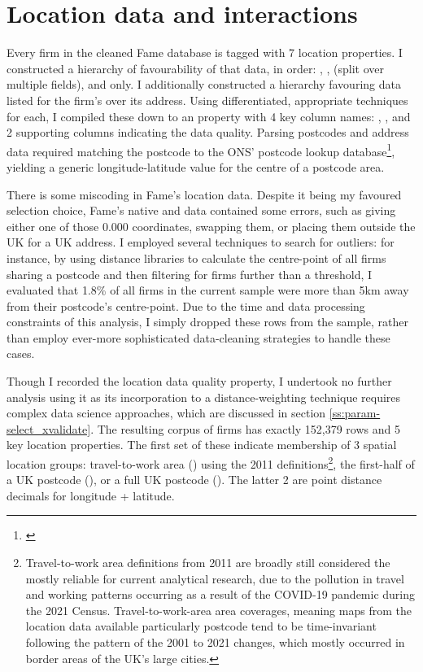 
\section{Location data and interactions}
\label{s:data-location}

Every firm in the cleaned Fame database is tagged with 7 location properties.
I constructed a hierarchy of favourability of that data, in order:
, ,  (split over multiple fields),
and  only. I additionally constructed a hierarchy favouring
data listed for the firm's  over its  address.
Using differentiated, appropriate techniques for each, I compiled these down
to an  property with 4 key column names: , ,
and 2 supporting columns indicating the data quality.
Parsing postcodes and address data required matching the postcode
to the ONS' postcode lookup database\footnote{\cite{ons2025:nspl}},
yielding a generic longitude-latitude value for the centre of a postcode area.
\par
There is some miscoding in Fame's location data.
Despite it being my favoured  selection choice,
Fame's native  and  data contained some errors,
such as giving either one of those $0.000$ coordinates, swapping them,
or placing them outside the UK for a UK address.
I employed several techniques to search for outliers:
for instance, by using distance libraries to calculate the centre-point of all firms sharing a postcode
and then filtering for firms further than a threshold,
I evaluated that 1.8\% of all firms in the current sample
were more than 5km away from their postcode's centre-point.
Due to the time and data processing constraints of this analysis,
I simply dropped these rows from the sample, rather than employ ever-more sophisticated
data-cleaning strategies to handle these cases.
\par
Though I recorded the location data quality property,
I undertook no further analysis using it as its incorporation
to a distance-weighting technique requires complex data science approaches,
which are discussed in section \ref{ss:param-select_xvalidate}.
The resulting corpus of firms has exactly 152,379 rows
and 5 key location properties. The first set of these indicate membership of 3 spatial location groups:
travel-to-work area () using the 2011
definitions\footnote{Travel-to-work area definitions from 2011 are broadly still considered
the mostly reliable for current analytical research,
due to the pollution in travel and working patterns occurring as a result of the COVID-19 pandemic during the 2021 Census.
Travel-to-work-area area coverages, meaning maps from the location data available particularly postcode
tend to be time-invariant following the pattern of the 2001 to 2021 changes,
which mostly occurred in border areas of the UK's large cities.},
the first-half of a UK postcode (), or a full UK postcode ().
The latter 2 are point distance decimals for longitude + latitude.

